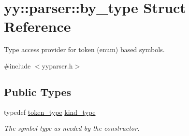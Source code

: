 \hypertarget{structyy_1_1parser_1_1by__type}{}\section{yy\+:\+:parser\+:\+:by\+\_\+type Struct Reference}
\label{structyy_1_1parser_1_1by__type}


Type access provider for token (enum) based symbols.  




{\ttfamily \#include $<$yyparser.\+h$>$}

\subsection*{Public Types}
\begin{DoxyCompactItemize}
\item 
\mbox{\label{structyy_1_1parser_1_1by__type_af8757490fd5397ad574e9fee1b80fa25}} 
typedef \hyperlink{classyy_1_1parser_ac1ba3f834abfa251ea746c4ca8da5a85}{token\+\_\+type} \hyperlink{structyy_1_1parser_1_1by__type_af8757490fd5397ad574e9fee1b80fa25}{kind\+\_\+type}
\begin{DoxyCompactList}\small\item\em The symbol type as needed by the constructor. \end{DoxyCompactList}\end{DoxyCompactItemize}
